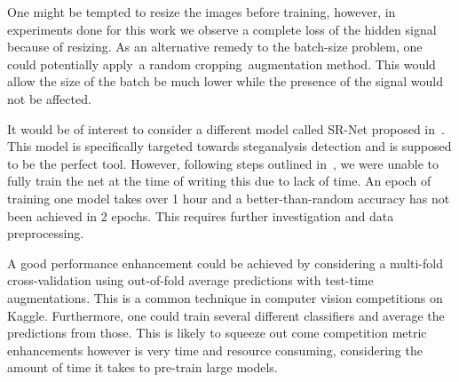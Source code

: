 \documentclass[letterpaper]{article}
\begin{document}
One might be tempted to resize the images before training, however, in experiments done for this work we observe a complete loss of the hidden signal because of resizing. As an alternative remedy to the batch-size problem, one could potentially apply~a random cropping~augmentation method. This would allow the size of the batch be much lower while the presence of the signal would not be affected.

It would be of interest to consider a different model called SR-Net proposed in~\cite{boroumand2018deep}. This model is specifically targeted towards steganalysis detection and is supposed to be the perfect tool. However, following steps outlined in~\cite{yousfi2019breaking}, we were unable to fully train the net at the time of writing this due to lack of time. An epoch of training one model takes over 1 hour and a better-than-random accuracy has not been achieved in 2 epochs. This requires further investigation and data preprocessing.

A good performance enhancement could be achieved by considering a multi-fold cross-validation using out-of-fold average predictions with test-time augmentations. This is a common technique in computer vision competitions on Kaggle. Furthermore, one could train several different classifiers and average the predictions from those. This is likely to squeeze out come competition metric enhancements however is very time and resource consuming, considering the amount of time it takes to pre-train large models.

\printbibliography{}
\end{document}
